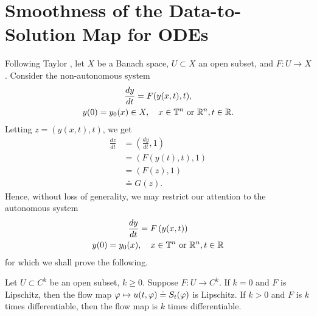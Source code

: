 \section{Smoothness of the Data-to-Solution Map for ODEs} 
\label{sec:dep-param-smooth}
%
%
Following Taylor \cite{Taylor:1995kx}, let $X$ be a Banach space, $U \subset X$ an open subset, and $F: U \to X$. Consider the non-autonomous system
%
%
\begin{gather}
  \label{aa-sm}
\frac{dy}{dt} = F(y(x,t), t),
\\
y(0)= y_{0}(x) \in X, \quad x \in \mathbb{T}^{n} \ \text{or} \ \mathbb{R}^{n},t \in \mathbb{R}.
\label{bb-sm}
\end{gather}
%
Letting $z = (y(x,t), t)$, we get
%
%
\begin{equation*}
\begin{split}
\frac{dz}{dt}  
& = \left (\frac{dy}{dt}, 1 \right )
\\
& = \left( F(y(t), t), 1 \right)
\\
& = \left( F(z), 1 \right)
\\
& \doteq G(z).
\end{split}
\end{equation*}
%
%
Hence, without loss of generality, we may restrict our attention to the
autonomous system
%
%
\begin{gather}
\frac{dy}{dt} = F\left( y(x,t) \right)
\label{ode-eq-sm}
\\
y(0) = y_{0}(x), \quad x \in \mathbb{T}^{n} \ \text{or} \ \mathbb{R}^{n},t \in \mathbb{R}
\label{ode-init-data-sm}
\end{gather}
%
%
%
for which we shall prove the following.
%
%
%
%
%
%
%
%
\begin{proposition}
  Let $U \subset C^{k}$ be an open subset, $k \ge 0$. Suppose
  $F: U \to C^{k}$.
  If $k = 0$ and $F$ is Lipschitz, then the flow map $\varphi \mapsto u(t, \varphi) \doteq S_{t}(\varphi)$ is Lipschitz. If $k > 0$ and $F$ is $k$ times differentiable, then the flow map is 
  $k$ times differentiable.
  \label{prop:reg-result}
\end{proposition}
%
%
%
%
